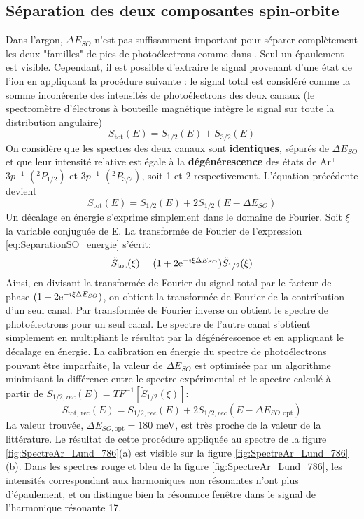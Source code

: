 \subsection{Séparation des deux composantes spin-orbite}
\label{subsec:SeparationSO}
Dans l'argon, $\Delta E_{SO}$ n'est pas suffisamment important pour séparer complètement les deux "familles" de pics de photoélectrons comme dans . Seul un épaulement est visible. Cependant, il est possible d'extraire le signal provenant d'une état de l'ion en appliquant la procédure suivante : le signal total est considéré comme la somme incohérente des intensités de photoélectrons des deux canaux (le spectromètre d'électrons à bouteille magnétique intègre le signal sur toute la distribution angulaire)
\begin{equation}
S_{\text{tot}} (E) = S_{1/2}(E) + S_{3/2}(E)
\end{equation} 
On considère que les spectres des deux canaux sont \textbf{identiques}, séparés de $\Delta E_{SO}$ et que leur intensité relative est égale à la \textbf{dégénérescence} des états de Ar$^+$ $3p^{-1}$ $(^{2}P_{1/2})$ et $3p^{-1}$ $(^{2}P_{3/2})$, soit 1 et 2 respectivement. L'équation précédente devient
\begin{equation}
S_{\text{tot}} (E) = S_{1/2}(E) + 2 S_{1/2}(E - \Delta E_{SO})
\label{eq:SeparationSO_energie}
\end{equation}
Un décalage en énergie s'exprime simplement dans le domaine de Fourier. Soit $\xi$ la variable conjuguée de E. La transformée de Fourier de l'expression \ref{eq:SeparationSO_energie} s'écrit:
\begin{equation}
\tilde{S}_{\text{tot}}(\xi) = (1 + 2 \mathrm{e}^{-i\xi \Delta E_{SO}} ) \tilde{S}_{1/2}(\xi)
\end{equation}
Ainsi, en divisant la transformée de Fourier du signal total par le facteur de phase $(1 + 2 \mathrm{e}^{-i\xi \Delta E_{SO}})$, on obtient la transformée de Fourier de la contribution d'un seul canal. Par transformée de Fourier inverse on obtient le spectre de photoélectrons pour un seul canal. Le spectre de l'autre canal s'obtient simplement en multipliant le résultat par la dégénérescence et en appliquant le décalage en énergie. La calibration en énergie du spectre de photoélectrons pouvant être imparfaite, la valeur de $\Delta E_{SO}$ est optimisée par un algorithme minimisant la différence entre le spectre expérimental et le spectre calculé à partir de $S_{1/2, rec}(E) = TF^{-1}[\tilde{S}_{1/2}(\xi)]$:
\begin{equation}
S_{\text{tot, rec}} (E) = S_{1/2, rec}(E) + 2 S_{1/2, rec}(E - \Delta E_{SO,\text{opt}})
\label{eq:Rabbit_reconstruit}
\end{equation}
La valeur trouvée, $\Delta E_{SO,\text{opt}} = 180$ meV, est très proche de la valeur de la littérature. Le résultat de cette procédure appliquée au spectre de la figure \ref{fig:SpectreAr_Lund_786}(a) est visible sur la figure \ref{fig:SpectreAr_Lund_786}(b). Dans les spectres rouge et bleu de la figure \ref{fig:SpectreAr_Lund_786}, les intensités correspondant aux harmoniques non résonantes n'ont plus d'épaulement, et on distingue bien la résonance fenêtre dans le signal de l'harmonique résonante 17.

